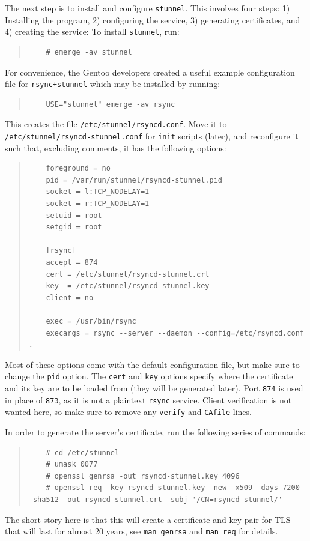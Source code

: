 \documentclass{article}
\begin{document}
The next step is to install and configure \texttt{stunnel}.  This involves four steps: 1) Installing the program, 2) configuring the service, 3) generating certificates, and 4) creating the service: To install \texttt{stunnel}, run:
\begin{quote}
\begin{verbatim}
	# emerge -av stunnel
\end{verbatim}
\end{quote}
For convenience, the Gentoo developers created a useful example configuration file for \texttt{rsync+stunnel} which may be installed by running:
\begin{quote}
\begin{verbatim}
	USE="stunnel" emerge -av rsync
\end{verbatim}
\end{quote}
This creates the file \texttt{/etc/stunnel/rsyncd.conf}.  Move it to \texttt{/etc/stunnel/rsyncd-stunnel.conf} for \texttt{init} scripts (later), and reconfigure it such that, excluding comments, it has the following options:
\begin{quote}
\begin{verbatim}
	foreground = no
	pid = /var/run/stunnel/rsyncd-stunnel.pid
	socket = l:TCP_NODELAY=1
	socket = r:TCP_NODELAY=1
	setuid = root
	setgid = root

	[rsync]
	accept = 874
	cert = /etc/stunnel/rsyncd-stunnel.crt
	key  = /etc/stunnel/rsyncd-stunnel.key
	client = no

	exec = /usr/bin/rsync
	execargs = rsync --server --daemon --config=/etc/rsyncd.conf .
\end{verbatim}
\end{quote}
Most of these options come with the default configuration file, but make sure to change the \texttt{pid} option.  The \texttt{cert} and \texttt{key} options specify where the  certificate and its key are to be loaded from (they will be generated later).  Port \texttt{874} is used in place of \texttt{873}, as it is not a plaintext \texttt{rsync} service.  Client verification is not wanted here, so make sure to remove any \texttt{verify} and \texttt{CAfile} lines.

In order to generate the server's certificate, run the following series of commands:
\begin{quote}
\begin{verbatim}
	# cd /etc/stunnel
	# umask 0077
	# openssl genrsa -out rsyncd-stunnel.key 4096
	# openssl req -key rsyncd-stunnel.key -new -x509 -days 7200 -sha512 -out rsyncd-stunnel.crt -subj '/CN=rsyncd-stunnel/'
\end{verbatim}
\end{quote}
The short story here is that this will create a certificate and key pair for TLS that will last for almost 20 years, see \texttt{man genrsa} and \texttt{man req} for details.
\end{document}
